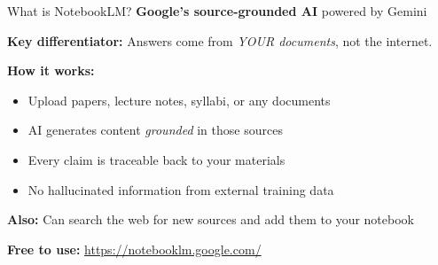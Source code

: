 \documentclass[aspectratio=169]{beamer}
\begin{document}

\begin{frame}{What is NotebookLM?}
    \textbf{Google's source-grounded AI} powered by Gemini

    \vspace{1em}
    \textbf{Key differentiator:} Answers come from \textit{YOUR documents}, not the internet.

    \vspace{1em}
    \textbf{How it works:}
    \begin{itemize}
        \item Upload papers, lecture notes, syllabi, or any documents
        \item AI generates content \textit{grounded} in those sources
        \item Every claim is traceable back to your materials
        \item No hallucinated information from external training data
    \end{itemize}

    \vspace{1em}
    \textbf{Also:} Can search the web for new sources and add them to your notebook

    \vspace{0.5em}
    \textbf{Free to use:} \url{https://notebooklm.google.com/}
\end{frame}
\end{document}
